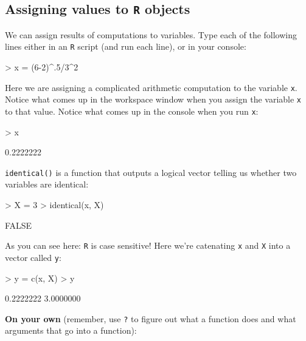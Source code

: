 \documentclass[answers]{exam}
\begin{document}
\subsection{Assigning values to \texttt{R} objects}

We can assign results of computations to variables. Type each of the following lines either in an \texttt{R} script (and run each line), or in your console:
\begin{Schunk}
\begin{Sinput}
> x = (6-2)^.5/3^2
\end{Sinput}
\end{Schunk}
Here we are assigning a complicated arithmetic computation to the variable \texttt{x}. Notice what comes up in the workspace window when you assign the variable \texttt{x} to that value. Notice what comes up in the console when you run \texttt{x}:
\begin{Schunk}
\begin{Sinput}
> x
\end{Sinput}
\begin{Soutput}
[1] 0.2222222
\end{Soutput}
\end{Schunk}
\texttt{identical()} is a function that outputs a logical vector telling us whether two variables are identical:
\begin{Schunk}
\begin{Sinput}
> X = 3 
> identical(x, X)  
\end{Sinput}
\begin{Soutput}
[1] FALSE
\end{Soutput}
\end{Schunk}
As you can see here: \texttt{R} is case sensitive! Here we're catenating \texttt{x} and \texttt{X} into a vector called \texttt{y}:
\begin{Schunk}
\begin{Sinput}
> y = c(x, X)  
> y
\end{Sinput}
\begin{Soutput}
[1] 0.2222222 3.0000000
\end{Soutput}
\end{Schunk}

\noindent\textbf{On your own} (remember, use \texttt{?} to figure out what a function does and what arguments that go into a function):
\end{document}
